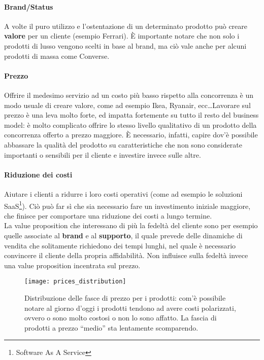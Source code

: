 \paragraph*{Brand/Status} A volte il puro utilizzo e l'ostentazione di un
determinato prodotto può creare \textbf{valore} per un cliente (esempio
Ferrari). È importante notare che non solo i prodotti di lusso vengono scelti
in base al brand, ma ciò vale anche per alcuni prodotti di massa come Converse.

\paragraph*{Prezzo} Offrire il medesimo servizio ad un costo più basso rispetto
alla concorrenza è un modo usuale di creare valore, come ad esempio Ikea,
Ryanair, ecc\dots Lavorare sul prezzo è una leva molto forte, ed impatta 
fortemente su tutto il resto del business model: è molto complicato offrire lo
stesso livello qualitativo di un prodotto della concorrenza offerto a prezzo
maggiore. È necessario, infatti, capire dov'è possibile abbassare la qualità
del prodotto su caratteristiche che non sono considerate importanti o sensibili
per il cliente e investire invece sulle altre.

\paragraph*{Riduzione dei costi} Aiutare i clienti a ridurre i loro costi
operativi (come ad esempio le soluzioni SaaS\footnote{Software As A Service}). 
Ciò può far sì che sia necessario fare un investimento iniziale maggiore,
che finisce per comportare una riduzione dei costi a lungo termine.\\[0.3cm]

La value proposition che interessano di più la fedeltà del cliente sono per
esempio quelle associate al \textbf{brand} e al \textbf{supporto}, il quale
prevede delle dinamiche di vendita che solitamente richiedono dei tempi lunghi,
nel quale è necessario convincere il cliente della propria affidabilità. Non
influisce sulla fedeltà invece una value proposition incentrata sul prezzo.

\begin{figure}[t]
 \centering
 \texttt{[image: prices\_distribution]}
 \caption[Distribuzione dei prezzi]{Distribuzione delle fasce di prezzo per i 
prodotti: com'è possibile notare al giorno d'oggi i prodotti tendono ad avere 
costi polarizzati, ovvero o sono molto costosi o non lo sono affatto. La fascia 
di prodotti a prezzo ``medio'' sta lentamente scomparendo.}
 \label{fig:vp:pd}
\end{figure}

